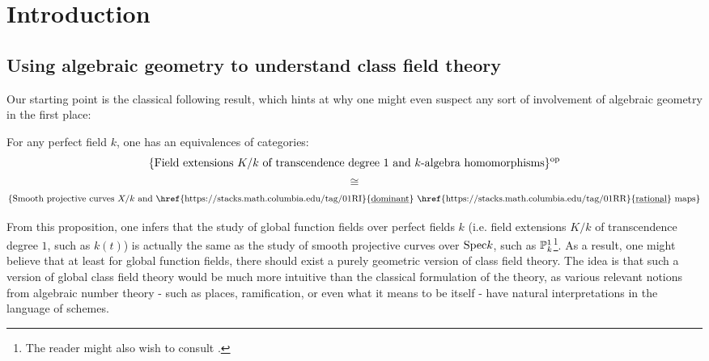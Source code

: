 \section{Introduction}
    \subsection{Using algebraic geometry to understand class field theory}
        Our starting point is the classical following result, which hints at why one might even suspect any sort of involvement of algebraic geometry in the first place:
        \begin{proposition} \label{prop: curves_and_function_fields}
            \cite[\href{https://stacks.math.columbia.edu/tag/0BY1}{Tag 0BY1}]{stacks} For any perfect field $k$, one has an equivalences of categories:
                $$\{\text{Field extensions $K/k$ of transcendence degree $1$ and $k$-algebra homomorphisms}\}^{\op}$$
                $$\cong$$
                $$\{\text{Smooth projective curves $X/k$ and \href{https://stacks.math.columbia.edu/tag/01RI}{\underline{dominant}} \href{https://stacks.math.columbia.edu/tag/01RR}{\underline{rational}} maps}\}$$
        \end{proposition}
        From this proposition, one infers that the study of global function fields over perfect fields $k$ (i.e. field extensions $K/k$ of transcendence degree $1$, such as $k(t)$) is actually the same as the study of smooth projective curves over $\Spec k$, such as $\P^1_k$\footnote{The reader might also wish to consult \cite[Sections I.13 and I.14]{neukirch_2010_algebraic_number_theory}.}. As a result, one might believe that at least for global function fields, there should exist a purely geometric version of class field theory. The idea is that such a version of global class field theory would be much more intuitive than the classical formulation of the theory, as various relevant notions from algebraic number theory - such as places, ramification, or even what it means to be  itself - have natural interpretations in the language of schemes. 
        
